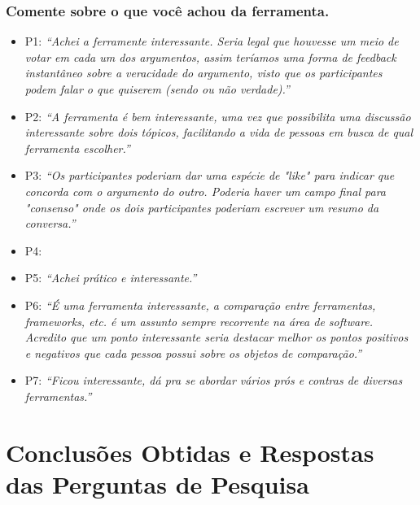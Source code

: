 \subsubsection{Comente sobre o que você achou da ferramenta.}

\begin{itemize}
  \item P1: \textit{``Achei a ferramente interessante. Seria legal que houvesse um meio de votar em cada um dos argumentos, assim teríamos uma forma de feedback instantâneo sobre a veracidade do argumento, visto que os participantes podem falar o que quiserem (sendo ou não verdade).''}
  \item P2: \textit{``A ferramenta é bem interessante, uma vez que possibilita uma discussão interessante sobre dois tópicos, facilitando a vida de pessoas em busca de qual ferramenta escolher.''}
  \item P3: \textit{``Os participantes poderiam dar uma espécie de "like" para indicar que concorda com o argumento do outro. Poderia haver um campo final para "consenso" onde os dois participantes poderiam escrever um resumo da conversa.''}
  \item P4:
  \item P5: \textit{``Achei prático e interessante.''}
  \item P6: \textit{``É uma ferramenta interessante, a comparação entre ferramentas, frameworks, etc. é um assunto sempre recorrente na área de software. Acredito que um ponto interessante seria destacar melhor os pontos positivos e negativos que cada pessoa possui sobre os objetos de comparação.''}
  \item P7: \textit{``Ficou interessante, dá pra se abordar vários prós e contras de diversas ferramentas.''}
\end{itemize}

\section{Conclusões Obtidas e Respostas das Perguntas de Pesquisa}